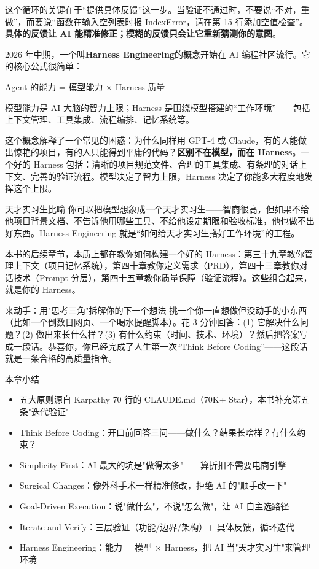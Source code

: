 这个循环的关键在于“提供具体反馈”这一步。当验证不通过时，不要说“不对，重做”，而要说“函数在输入空列表时报 IndexError，请在第 15 行添加空值检查”。\textbf{具体的反馈让 AI 能精准修正；模糊的反馈只会让它重新猜测你的意图}。


2026 年中期，一个叫\textbf{Harness Engineering}的概念开始在 AI 编程社区流行。它的核心公式很简单：

Agent 的能力 = 模型能力 × Harness 质量

模型能力是 AI 大脑的智力上限；Harness 是围绕模型搭建的“工作环境”——包括上下文管理、工具集成、流程编排、记忆系统等。

这个概念解释了一个常见的困惑：为什么同样用 GPT-4 或 Claude，有的人能做出惊艳的项目，有的人只能得到平庸的代码？\textbf{区别不在模型，而在 Harness}。一个好的 Harness 包括：清晰的项目规范文件、合理的工具集成、有条理的对话上下文、完善的验证流程。模型决定了智力上限，Harness 决定了你能多大程度地发挥这个上限。

\begin{tcbinfo}{天才实习生比喻}
你可以把模型想象成一个天才实习生——智商很高，但如果不给他项目背景文档、不告诉他用哪些工具、不给他设定期限和验收标准，他也做不出好东西。Harness Engineering 就是“如何给天才实习生搭好工作环境”的工程。

\end{tcbinfo}

本书的后续章节，本质上都在教你如何构建一个好的 Harness：第三十九章教你管理上下文（项目记忆系统），第四十章教你定义需求（PRD），第四十三章教你对话技术（Prompt 分层），第四十五章教你质量保障（验证流程）。这些组合起来，就是你的 Harness。

\begin{tcbpractice}{来动手：用"思考三角"拆解你的下一个想法}
挑一个你一直想做但没动手的小东西（比如一个倒数日网页、一个喝水提醒脚本）。花 3 分钟回答：(1) 它解决什么问题？(2) 做出来长什么样？(3) 有什么约束（时间、技术、环境）？然后把答案写成一段话。恭喜你，你已经完成了人生第一次“Think Before Coding”——这段话就是一条合格的高质量指令。

\end{tcbpractice}

\begin{tcbsummary}{本章小结}
\begin{itemize}
  \item 五大原则源自 Karpathy 70 行的 CLAUDE.md（70K+ Star），本书补充第五条"迭代验证"
  \item Think Before Coding：开口前回答三问——做什么？结果长啥样？有什么约束？
  \item Simplicity First：AI 最大的坑是"做得太多"——算折扣不需要电商引擎
  \item Surgical Changes：像外科手术一样精准修改，拒绝 AI 的"顺手改一下"
  \item Goal-Driven Execution：说"做什么"，不说"怎么做"，让 AI 自主选路径
  \item Iterate and Verify：三层验证（功能/边界/架构）+ 具体反馈，循环迭代
  \item Harness Engineering：能力 = 模型 × Harness，把 AI 当"天才实习生"来管理环境
\end{itemize}

\end{tcbsummary}
